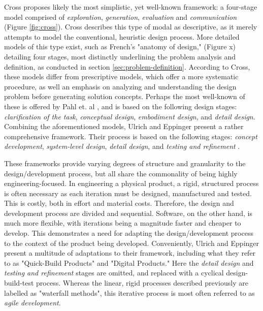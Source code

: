 Cross \cite{cross} proposes likely the most simplistic, yet well-known framework: a four-stage model comprised of \textit{exploration}, \textit{generation}, \textit{evaluation} and \textit{communication} (Figure \ref{fig:cross}). Cross describes this type of modal as descriptive, as it merely attempts to model the conventional, heuristic design process. More detailed models of this type exist, such as French's \cite{french} "anatomy of design," (Figure x) detailing four stages, most distinctly underlining the problem analysis and definition, as conducted in section \ref{sec:problem-definition}. According to Cross, these models differ from prescriptive models, which offer a more systematic procedure, as well an emphasis on analyzing and understanding the design problem before generating solution concepts. Perhaps the most well-known of these is offered by Pahl et. al \cite{pahl_beitz}, and is based on the following design stages: \textit{clarification of the task}, \textit{conceptual design}, \textit{embodiment design}, and \textit{detail design}. Combining the aforementioned models, Ulrich and Eppinger present a rather comprehensive framework. Their process is based on the following stages: \textit{concept development}, \textit{system-level design}, \textit{detail design}, and \textit{testing and refinement} \cite{ulrich_eppinger}.

These frameworks provide varying degrees of structure and granularity to the design/development process, but all share the commonality of being highly engineering-focused. In engineering a physical product, a rigid, structured process is often necessary as each iteration must be designed, manufactured and tested. This is costly, both in effort and material costs. Therefore, the design and development process are divided and sequential. Software, on the other hand, is much more flexible, with iterations being a magnitude faster and cheaper to develop. This demonstrates a need for adapting the design/development process to the context of the product being developed. Conveniently, Ulrich and Eppinger present a multitude of adaptations to their framework, including what they refer to as "Quick-Build Products" and "Digital Products." Here the \textit{detail design} and \textit{testing and refinement} stages are omitted, and replaced with a cyclical design-build-test process. Whereas the linear, rigid processes described previously are labelled as "waterfall methods", this iterative process is most often referred to as \textit{agile development}.

